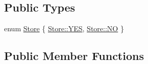 \subsection*{Public Types}
\begin{DoxyCompactItemize}
\item 
enum \mbox{\hyperlink{classlucene_1_1core_1_1document_1_1Field_a7d5d79f0c56d3548ab8d46d0e7dae35d}{Store}} \{ \mbox{\hyperlink{classlucene_1_1core_1_1document_1_1Field_a7d5d79f0c56d3548ab8d46d0e7dae35da7469a286259799e5b37e5db9296f00b3}{Store\+::\+Y\+ES}}, 
\mbox{\hyperlink{classlucene_1_1core_1_1document_1_1Field_a7d5d79f0c56d3548ab8d46d0e7dae35dac2f3f489a00553e7a01d369c103c7251}{Store\+::\+NO}}
 \}
\end{DoxyCompactItemize}
\subsection*{Public Member Functions}

